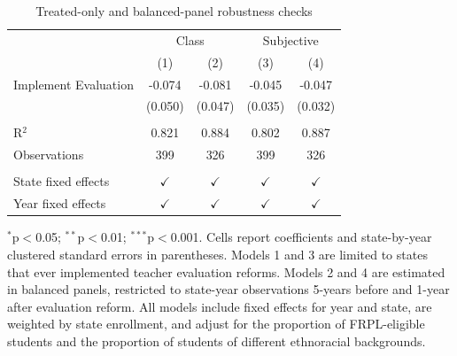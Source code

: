 
\begin{table}[!htbp]
   \caption{\label{tab:robust} Treated-only and balanced-panel robustness checks}
   \bigskip
   \centering
   \begin{tabular}{lcccc}
      \toprule
       & \multicolumn{2}{c}{Class} & \multicolumn{2}{c}{Subjective}\\
                           & (1)           & (2)           & (3)           & (4)\\  
      \midrule 
      Implement Evaluation & -0.074        & -0.081        & -0.045        & -0.047\\   
                           & (0.050)       & (0.047)       & (0.035)       & (0.032)\\   
       \\
      R$^2$                & 0.821         & 0.884         & 0.802         & 0.887\\  
      Observations         & 399           & 326           & 399           & 326\\  
       \\
      State fixed effects  & $\checkmark$  & $\checkmark$  & $\checkmark$  & $\checkmark$\\   
      Year fixed effects   & $\checkmark$  & $\checkmark$  & $\checkmark$  & $\checkmark$\\   
      \bottomrule
   \end{tabular}
   
   \par \raggedright 
   $^{*}$p$<$0.05; $^{**}$p$<$0.01; $^{***}$p$<$0.001. Cells report coefficients and state-by-year clustered standard errors in parentheses. Models 1 and 3 are limited to states that ever implemented teacher evaluation reforms. Models 2 and 4 are estimated in balanced panels, restricted to state-year observations 5-years before and 1-year after evaluation reform. All models include fixed effects for year and state, are weighted by state enrollment, and adjust for the proportion of FRPL-eligible students and the proportion of students of different ethnoracial backgrounds.
\end{table}


